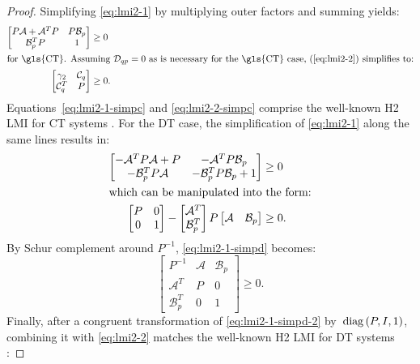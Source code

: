 \begin{proof}
	Simplifying \autoref{eq:lmi2-1} by multiplying outer factors and summing yields:
	\begin{align}
		\begin{bmatrix}
			P\mathcal{A} + \mathcal{A}^TP & P\mathcal{B}_p \\
			\mathcal{B}_p^TP & 1
		\end{bmatrix} &\geq 0 \label{eq:lmi2-1-simpc} \\
		\shortintertext{for \gls{CT}. Assuming $\mathcal{D}_{qp} = 0$ as is necessary for the \gls{CT} case, (\ref{eq:lmi2-2}) simplifies to:}
		\begin{bmatrix}
			\gamma_2 & \mathcal{C}_q \\
			\mathcal{C}_q^T & P
		\end{bmatrix} &\geq 0 \label{eq:lmi2-2-simpc}.
	\end{align}
	Equations~\ref{eq:lmi2-1-simpc} and \ref{eq:lmi2-2-simpc} comprise the well-known \gls{H2} \gls{LMI} for \gls{CT} systems \cite{Scherer1997, Masubuchi1998}. For the \gls{DT} case, the simplification of \autoref{eq:lmi2-1} along the same lines results in:
	\begin{align}
		\begin{bmatrix}
			-\mathcal{A}^TP\mathcal{A} + P & -\mathcal{A}^TP\mathcal{B}_p \\
			-\mathcal{B}_p^TP\mathcal{A} & -\mathcal{B}_p^TP\mathcal{B}_p + 1
		\end{bmatrix} &\geq 0 \\
		\shortintertext{which can be manipulated into the form:}
		\begin{bmatrix}
			P & 0 \\
			0 & 1
		\end{bmatrix} -
		\begin{bmatrix}
			\mathcal{A}^T \\
			\mathcal{B}_p^T
		\end{bmatrix} P
		\begin{bmatrix}
			\mathcal{A} & \mathcal{B}_p
		\end{bmatrix} &\geq 0 \label{eq:lmi2-1-simpd}.
	\end{align}
	By Schur complement around $P^{-1}$, \autoref{eq:lmi2-1-simpd} becomes:
	\begin{equation}
		\begin{bmatrix}
			P^{-1} & \mathcal{A} & \mathcal{B}_p \\
			\mathcal{A}^T & P & 0 \\
			\mathcal{B}_p^T & 0 & 1
		\end{bmatrix} \geq 0 \label{eq:lmi2-1-simpd-2}.
	\end{equation}
	Finally, after a congruent transformation of \autoref{eq:lmi2-1-simpd-2} by~$\operatorname{diag}\left(P, I, 1\right)$, combining it with \autoref{eq:lmi2-2} matches the well-known \gls{H2} \gls{LMI} for \gls{DT} systems \cite{Masubuchi1998}:
	

\end{proof}
